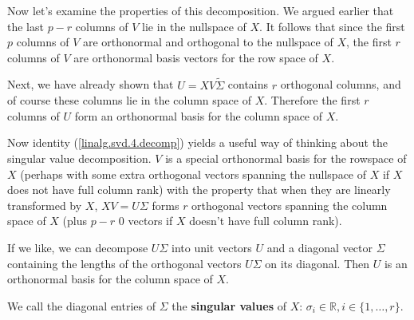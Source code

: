 
Now let's examine the properties of this decomposition. We argued earlier that the last \(p - r\) columns of \(V\) lie in the nullspace of \(X\). It follows that since the first \(p\) columns of \(V\) are orthonormal and orthogonal to the nullspace of \(X\), the first \(r\) columns of \(V\) are orthonormal basis vectors for the row space of \(X\). 

Next, we have already shown that \(U = XV \tilde{\Sigma}\) contains \(r\) orthogonal columns, and of course these columns lie in the column space of \(X\). Therefore the first \(r\) columns of \(U\) form an orthonormal basis for the column space of \(X\).

 
Now identity (\ref{linalg.svd.4.decomp}) yields a useful way of thinking about the singular value decomposition. \(V\) is a special orthonormal basis for the rowspace of \(X\) (perhaps with some extra orthogonal vectors spanning the nullspace of \(X\) if \(X\) does not have full column rank) with the property that when they are linearly transformed by \(X\), \(XV = U \Sigma\) forms \(r\) orthogonal vectors spanning the column space of \(X\) (plus \(p -r\) 0 vectors if \(X\) doesn't have full column rank). 

If we like, we can decompose \(U \Sigma\) into unit vectors \(U\) and a diagonal vector \(\Sigma\) containing the lengths of the orthogonal vectors \(U \Sigma\) on its diagonal. Then \(U\) is an orthonormal basis for the column space of \(X\).

We call the diagonal entries of \(\Sigma\) the \textbf{singular values} of \(X\): \(\sigma_i \in \mathbb{R}, i \in \{1, \ldots, r\}\). 

